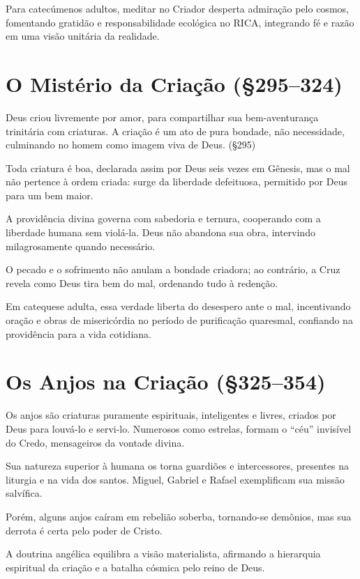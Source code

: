 Para catecúmenos adultos, meditar no Criador desperta admiração pelo cosmos, fomentando gratidão e responsabilidade ecológica no RICA, integrando fé e razão em uma visão unitária da realidade.

\section{O Mistério da Criação (\S 295--324)}

Deus criou livremente por amor, para compartilhar sua bem-aventuran\-ça trinitária com criaturas. A criação é um ato de pura bondade, não necessidade, culminando no homem como imagem viva de Deus. (\S 295)

Toda criatura é boa, declarada assim por Deus seis vezes em Gênesis, mas o mal não pertence à ordem criada: surge da liberdade defeituosa, permitido por Deus para um bem maior.

A providência divina governa com sabedoria e ternura, cooperando com a liberdade humana sem violá-la. Deus não abandona sua obra, intervindo milagrosamente quando necessário.

O pecado e o sofrimento não anulam a bondade criadora; ao contrário, a Cruz revela como Deus tira bem do mal, ordenando tudo à redenção.

Em catequese adulta, essa verdade liberta do desespero ante o mal, incentivando oração e obras de misericórdia no período de purificação quaresmal, confiando na providência para a vida cotidiana.

\section{Os Anjos na Criação (\S 325--354)}

Os anjos são criaturas puramente espirituais, inteligentes e livres, criados por Deus para louvá-lo e servi-lo. Numerosos como estrelas, formam o ``céu'' invisível do Credo, mensageiros da vontade divina.

Sua natureza superior à humana os torna guardiões e intercessores, presentes na liturgia e na vida dos santos. Miguel, Gabriel e Rafael exemplificam sua missão salvífica.

Porém, alguns anjos caíram em rebelião soberba, tornando-se demônios, mas sua derrota é certa pelo poder de Cristo.

A doutrina angélica equilibra a visão materialista, afirmando a hierarquia espiritual da criação e a batalha cósmica pelo reino de Deus.


